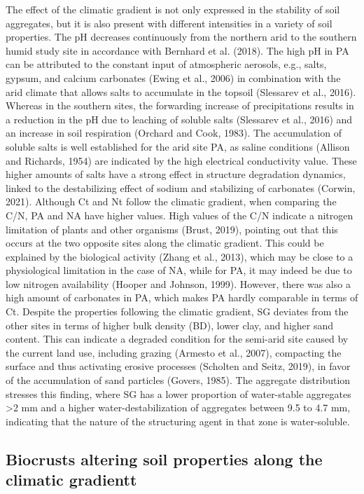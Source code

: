 {The effect of the climatic gradient is not only expressed in the stability of soil aggregates, but it is also present with different intensities in a variety of soil properties. The pH decreases continuously from the northern arid to the southern humid study site in accordance with Bernhard et al. (2018). The high pH in PA can be attributed to the constant input of atmospheric aerosols, e.g., salts, gypsum, and calcium carbonates (Ewing et al., 2006) in combination with the arid climate that allows salts to accumulate in the topsoil (Slessarev et al., 2016). Whereas in the southern sites, the forwarding increase of precipitations results in a reduction in the pH due to leaching of soluble salts (Slessarev et al., 2016) and an increase in soil respiration (Orchard and Cook, 1983). The accumulation of soluble salts is well established for the arid site PA, as saline conditions (Allison and Richards, 1954) are indicated by the high electrical conductivity value. These higher amounts of salts have a strong effect in structure degradation dynamics, linked to the destabilizing effect of sodium and stabilizing of carbonates (Corwin, 2021). Although Ct and Nt follow the climatic gradient, when comparing the C/N, PA and NA have higher values. High values of the C/N indicate a nitrogen limitation of plants and other organisms (Brust, 2019), pointing out that this occurs at the two opposite sites along the climatic gradient. This could be explained by the biological activity (Zhang et al., 2013), which may be close to a physiological limitation in the case of NA, while for PA, it may indeed be due to low nitrogen availability (Hooper and Johnson, 1999). However, there was also a high amount of carbonates in PA, which makes PA hardly comparable in terms of Ct. Despite the properties following the climatic gradient, SG deviates from the other sites in terms of higher bulk density (BD), lower clay, and higher sand content. This can indicate a degraded condition for the semi-arid site caused by the current land use, including grazing (Armesto et al., 2007), compacting the surface and thus activating erosive processes (Scholten and Seitz, 2019), in favor of the accumulation of sand particles (Govers, 1985). The aggregate distribution stresses this finding, where SG has a lower proportion of water-stable aggregates >2 mm and a higher water-destabilization of aggregates between 9.5 to 4.7 mm, indicating that the nature of the structuring agent in that zone is water-soluble.


\subsection{Biocrusts altering soil properties along the climatic gradientt}

}
